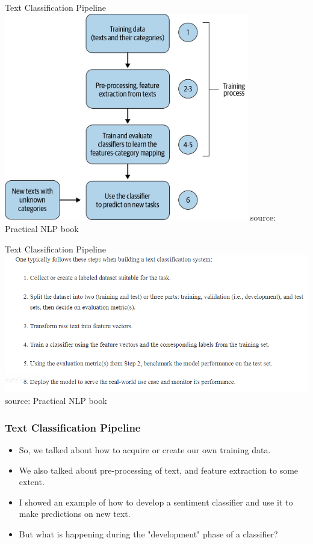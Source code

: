 \documentclass{beamer}
\begin{document}
\begin{frame}{Text Classification Pipeline}
    \includegraphics[width=0.8\textwidth]{figures/tcpipeline.png}
    source: Practical NLP book
\end{frame}

\begin{frame}{Text Classification Pipeline}
    \includegraphics[width=\textwidth]{figures/tcsteps.png}
        source: Practical NLP book
\end{frame}

\begin{frame}
\frametitle{Text Classification Pipeline}
\begin{itemize}
    \item So, we talked about how to acquire or create our own training data.
    \item We also talked about pre-processing of text, and feature extraction to some extent.
    \item I showed an example of how to develop a sentiment classifier and use it to make predictions on new text.
    \item But what is happening during the "development" phase of a classifier? 
\end{itemize}
\end{frame}
\end{document}
